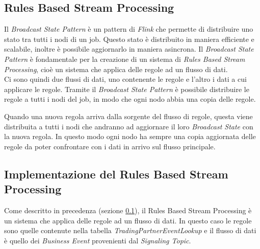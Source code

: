 \subsection{Rules Based Stream Processing}
\label{subsec:RulesBasedStreamProcessing}
Il \textit{Broadcast State Pattern} è un pattern di \textit{Flink} che permette di distribuire uno stato tra tutti i nodi di un job.
Questo stato è distribuito in maniera efficiente e scalabile, inoltre è possibile aggiornarlo in maniera asincrona.
Il \textit{Broadcast State Pattern} è fondamentale per la creazione di un sistema di \textit{Rules Based Stream Processing}, 
cioè un sistema che applica delle regole ad un flusso di dati.\\
Ci sono quindi due flussi di dati, uno contenente le regole e l'altro i dati a cui applicare le regole.
Tramite il \textit{Broadcast State Pattern} è possibile distribuire le regole a tutti i nodi del job, in modo che ogni nodo abbia una copia delle regole.

Quando una nuova regola arriva dalla sorgente del flusso di regole, questa viene distribuita a tutti i nodi che andranno ad aggiornare il loro \textit{Broadcast State}
con la nuova regola. In questo modo ogni nodo ha sempre una copia aggiornata delle regole da poter confrontare con i dati in arrivo sul flusso principale.

\subsection{Implementazione del Rules Based Stream Processing}
\label{subsec:ImplementazioneDelRulesBasedStreamProcessing}
Come descritto in precedenza (sezione \ref{subsec:RulesBasedStreamProcessing}), il Rules Based Stream Processing è un sistema che applica delle regole ad un flusso di dati.
In questo caso le regole sono quelle contenute nella tabella \textit{TradingPartnerEventLookup} e il flusso di dati è quello dei \textit{Business Event} provenienti dal \textit{Signaling Topic}.